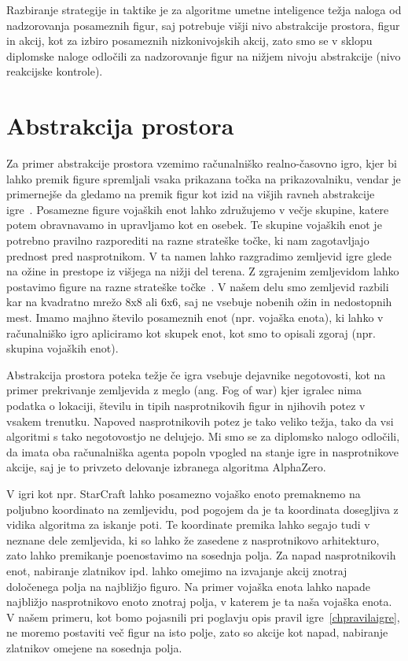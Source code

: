 \documentclass[a4paper, 12pt]{book}
\begin{document}
Razbiranje strategije in taktike je za algoritme umetne inteligence težja naloga od nadzorovanja posameznih figur, saj potrebuje višji nivo abstrakcije prostora, figur in akcij, kot za izbiro posameznih nizkonivojskih akcij, zato smo se v sklopu diplomske naloge odločili za nadzorovanje figur na nižjem nivoju abstrakcije (nivo reakcijske kontrole).

\section{Abstrakcija prostora}
Za primer abstrakcije prostora vzemimo računalniško realno-časovno igro, kjer bi lahko premik figure spremljali vsaka prikazana točka na prikazovalniku, vendar je primernejše da gledamo na premik figur kot izid na višjih ravneh abstrakcije igre~\cite{uriarte2015automatic}.
Posamezne figure vojaških enot lahko združujemo v večje skupine, katere potem obravnavamo in upravljamo kot en osebek.
Te skupine vojaških enot je potrebno pravilno razporediti na razne strateške točke, ki nam zagotavljajo prednost pred nasprotnikom.
V ta namen lahko razgradimo zemljevid igre glede na ožine in prestope iz višjega na nižji del terena.
Z zgrajenim zemljevidom lahko postavimo figure na razne strateške točke~\cite{uriarte2014game}.
V našem delu smo zemljevid razbili kar na kvadratno mrežo 8x8 ali 6x6, saj ne vsebuje nobenih ožin in nedostopnih mest.
Imamo majhno število posameznih enot (npr. vojaška enota), ki lahko v računalniško igro apliciramo kot skupek enot, kot smo to opisali zgoraj (npr. skupina vojaških enot).

Abstrakcija prostora poteka težje če igra vsebuje dejavnike negotovosti, kot na primer prekrivanje zemljevida z meglo (ang. Fog of war) kjer igralec nima podatka o lokaciji, številu in tipih nasprotnikovih figur in njihovih potez v vsakem trenutku. 
Napoved nasprotnikovih potez je tako veliko težja, tako da vsi algoritmi s tako negotovostjo ne delujejo.
Mi smo se za diplomsko nalogo odločili, da imata oba računalniška agenta popoln vpogled na stanje igre in nasprotnikove akcije, saj je to privzeto delovanje izbranega algoritma AlphaZero.

V igri kot npr. StarCraft lahko posamezno vojaško enoto premaknemo na poljubno koordinato na zemljevidu, pod pogojem da je ta koordinata dosegljiva z vidika algoritma za iskanje poti.
Te koordinate premika lahko segajo tudi v neznane dele zemljevida, ki so lahko že zasedene z nasprotnikovo arhitekturo, zato lahko premikanje poenostavimo na sosednja polja.
Za napad nasprotnikovih enot, nabiranje zlatnikov ipd. lahko omejimo na izvajanje akcij znotraj določenega polja na najbližjo figuro.
Na primer vojaška enota lahko napade najbližjo nasprotnikovo enoto znotraj polja, v katerem je ta naša vojaška enota.
V našem primeru, kot bomo pojasnili pri poglavju opis pravil igre~\ref{chpravilaigre}, ne moremo postaviti več figur na isto polje, zato so akcije kot napad, nabiranje zlatnikov omejene na sosednja polja.
\end{document}
